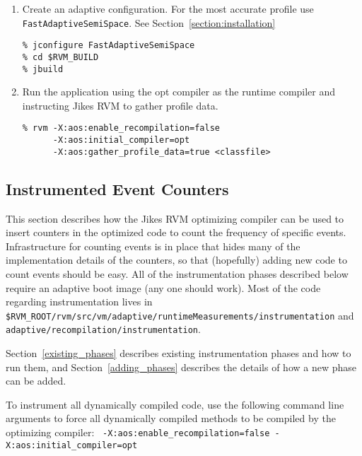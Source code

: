 \begin{enumerate}
\item Create an adaptive configuration.  For the most accurate profile use
{\tt FastAdaptiveSemiSpace}.  See Section~\ref{section:installation}
\begin{verbatim}
% jconfigure FastAdaptiveSemiSpace
% cd $RVM_BUILD
% jbuild
\end{verbatim}

\item Run the application using the opt compiler as the runtime compiler and
instructing Jikes RVM to gather profile data.
\begin{verbatim}
% rvm -X:aos:enable_recompilation=false 
      -X:aos:initial_compiler=opt 
      -X:aos:gather_profile_data=true <classfile>
\end{verbatim}
\end{enumerate}

\subsection{Instrumented Event Counters}
\label{counting_events}
This section describes how the Jikes RVM optimizing compiler can be
used to insert counters in the optimized code to count the frequency
of specific events.  Infrastructure for counting events is in place
that hides many of the implementation details of the counters, so that
(hopefully) adding new code to count events should be easy.  All of
the instrumentation phases described below require an adaptive boot
image (any one should work).  Most of the code regarding
instrumentation lives in {\tt
\$RVM\_ROOT/rvm/src/vm/adaptive/runtimeMeasurements/instrumentation} and {\tt
adaptive/recompilation/instrumentation}.

Section~\ref{existing_phases} describes existing instrumentation
phases and how to run them, and Section~\ref{adding_phases}
describes the details of how a new phase can be added.

To instrument all dynamically compiled code, use the following command
line arguments to force all dynamically compiled methods to be
compiled by the optimizing compiler: {\tt
-X:aos:enable\_recompilation=false -X:aos:initial\_compiler=opt}

